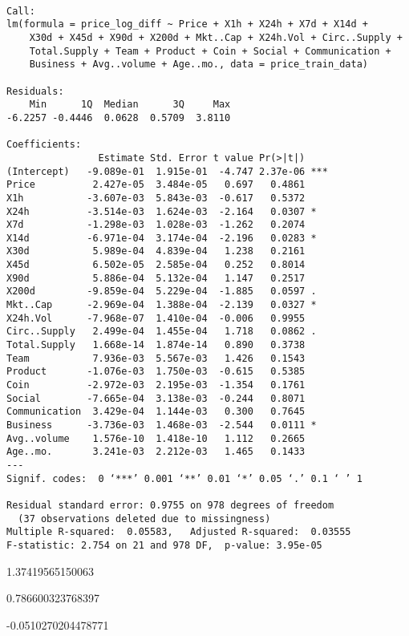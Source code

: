 \documentclass[11pt]{article}
\begin{document}
    \begin{verbatim}

Call:
lm(formula = price_log_diff ~ Price + X1h + X24h + X7d + X14d +
    X30d + X45d + X90d + X200d + Mkt..Cap + X24h.Vol + Circ..Supply +
    Total.Supply + Team + Product + Coin + Social + Communication +
    Business + Avg..volume + Age..mo., data = price_train_data)

Residuals:
    Min      1Q  Median      3Q     Max
-6.2257 -0.4446  0.0628  0.5709  3.8110

Coefficients:
                Estimate Std. Error t value Pr(>|t|)
(Intercept)   -9.089e-01  1.915e-01  -4.747 2.37e-06 ***
Price          2.427e-05  3.484e-05   0.697   0.4861
X1h           -3.607e-03  5.843e-03  -0.617   0.5372
X24h          -3.514e-03  1.624e-03  -2.164   0.0307 *
X7d           -1.298e-03  1.028e-03  -1.262   0.2074
X14d          -6.971e-04  3.174e-04  -2.196   0.0283 *
X30d           5.989e-04  4.839e-04   1.238   0.2161
X45d           6.502e-05  2.585e-04   0.252   0.8014
X90d           5.886e-04  5.132e-04   1.147   0.2517
X200d         -9.859e-04  5.229e-04  -1.885   0.0597 .
Mkt..Cap      -2.969e-04  1.388e-04  -2.139   0.0327 *
X24h.Vol      -7.968e-07  1.410e-04  -0.006   0.9955
Circ..Supply   2.499e-04  1.455e-04   1.718   0.0862 .
Total.Supply   1.668e-14  1.874e-14   0.890   0.3738
Team           7.936e-03  5.567e-03   1.426   0.1543
Product       -1.076e-03  1.750e-03  -0.615   0.5385
Coin          -2.972e-03  2.195e-03  -1.354   0.1761
Social        -7.665e-04  3.138e-03  -0.244   0.8071
Communication  3.429e-04  1.144e-03   0.300   0.7645
Business      -3.736e-03  1.468e-03  -2.544   0.0111 *
Avg..volume    1.576e-10  1.418e-10   1.112   0.2665
Age..mo.       3.241e-03  2.212e-03   1.465   0.1433
---
Signif. codes:  0 ‘***’ 0.001 ‘**’ 0.01 ‘*’ 0.05 ‘.’ 0.1 ‘ ’ 1

Residual standard error: 0.9755 on 978 degrees of freedom
  (37 observations deleted due to missingness)
Multiple R-squared:  0.05583,	Adjusted R-squared:  0.03555
F-statistic: 2.754 on 21 and 978 DF,  p-value: 3.95e-05

    \end{verbatim}


    \begin{enumerate*}
\item 1.37419565150063
\item 0.786600323768397
\item -0.0510270204478771
\end{enumerate*}
\end{document}

